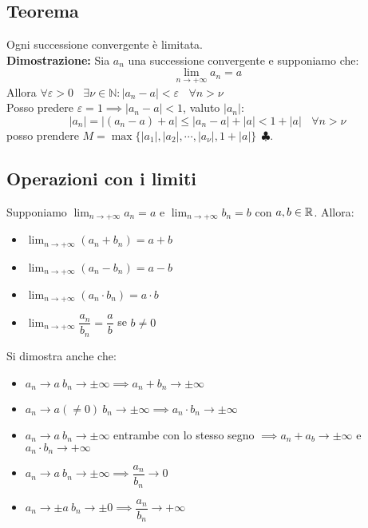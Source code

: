 \documentclass[../../main.tex]{subfiles}
\begin{document}
\subsection{Teorema}
Ogni successione convergente è limitata.\\ \textbf{Dimostrazione:} Sia $a_n$
una successione convergente e supponiamo che:
\[
    \lim_{n\to+\infty}a_n = a
\]
Allora $\forall\varepsilon > 0 \ \ \ \ \exists \nu \in \mathbb{N} : |a_n - a| <
    \varepsilon \ \ \ \ \forall n > \nu$\\ Posso predere $\varepsilon = 1 \implies
    |a_n - a|<1$, valuto $|a_n|$:
\[
    |a_n| = |(a_n-a) + a| \leq |a_n-a| + |a| < 1 + |a| \ \ \ \ \forall n > \nu
\]
posso prendere $M = \max\{|a_1|, |a_2|, \cdots, |a_\nu|, 1+|a|\} \ \
    \clubsuit$.

\subsection{Operazioni con i limiti}
Supponiamo $\lim_{n\to+\infty} a_n = a$ e $\lim_{n\to+\infty} b_n = b$ con $a,
    b \in \mathbb{R}$. Allora:
\begin{itemize}
    \item $\lim_{n\to+\infty} (a_n + b_n) = a + b$
    \item $\lim_{n\to+\infty} (a_n - b_n) = a - b$
    \item $\lim_{n\to+\infty} (a_n \cdot b_n) = a \cdot b$
    \item $\lim_{n\to+\infty} \dfrac{a_n}{b_n} = \dfrac{a}{b}$ se $b \neq 0$
\end{itemize}
Si dimostra anche che:
\begin{itemize}
    \item $a_n \to a \ b_n \to \pm\infty \implies a_n + b_n \to \pm\infty$
    \item $a_n \to a (\ne0) \ b_n \to\pm\infty \implies a_n\cdot b_n \to \pm\infty$
    \item $a_n \to a \ b_n \to \pm\infty$ entrambe con lo stesso segno $\implies a_n + a_b \to \pm\infty$ e $a_n\cdot b_n \to +\infty$
    \item $a_n \to a \ b_n\to\pm\infty \implies \dfrac{a_n}{b_n} \to 0$
    \item $a_n \to \pm a \ b_n \to \pm0 \implies \dfrac{a_n}{b_n} \to +\infty$
\end{itemize}
\end{document}
